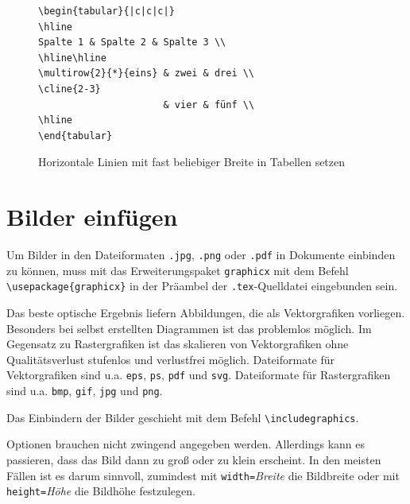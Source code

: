 \documentclass[a4paper,10pt,twoside]{scrbook}
\begin{document}
{\begin{figure}[H]
\begin{minipage}[t]{0.54\textwidth}
\begin{lstlisting}[label=tabularcline, style=customlatex]
\begin{tabular}{|c|c|c|}
\hline
Spalte 1 & Spalte 2 & Spalte 3 \\
\hline\hline
\multirow{2}{*}{eins} & zwei & drei \\
\cline{2-3}
                      & vier & fünf \\
\hline
\end{tabular}
\end{lstlisting}
\end{minipage}
\caption{Horizontale Linien mit fast beliebiger Breite in Tabellen setzen}
\label{Beispiel_cline}
\end{figure}




\chapter{Bilder einfügen}
\label{KapitelBilder}


Um Bilder in den Dateiformaten \verb!.jpg!, \verb!.png! oder \verb!.pdf! in Dokumente einbinden zu können, muss mit das Erweiterungspaket \verb!graphicx! mit dem Befehl \verb!\usepackage{graphicx}! in der Präambel der \verb!.tex!-Quelldatei eingebunden sein.

Das beste optische Ergebnis liefern Abbildungen, die als Vektorgrafiken vorliegen. Besonders bei selbst erstellten Diagrammen ist das problemlos möglich. Im Gegensatz zu Rastergrafiken ist das skalieren von Vektorgrafiken ohne Qualitätsverlust stufenlos und verlustfrei möglich. Dateiformate für Vektorgrafiken sind u.a. \verb!eps!, \verb!ps!, \verb!pdf! und \verb!svg!. Dateiformate für Rastergrafiken sind u.a. \verb!bmp!, \verb!gif!, \verb!jpg! und \verb!png!.

Das Einbindern der Bilder geschieht mit dem Befehl \verb!\includegraphics!.


Optionen brauchen nicht zwingend angegeben werden. Allerdings kann es 
passieren, dass das Bild dann zu groß oder zu
klein erscheint. In den meisten Fällen ist es darum sinnvoll, zumindest mit
\verb!width=!\textsl{Breite} die Bildbreite oder mit 
\verb!height=!\textsl{Höhe} die Bildhöhe festzulegen.



}
\end{document}
